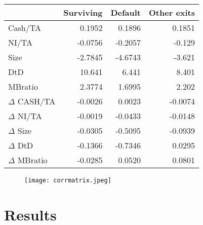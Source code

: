 \begin{table}[]
    \centering
    \begin{tabular}{lrrr}
    \hline \hline
                 & Surviving &   Default  & Other exits \\
    \hline
Cash/TA          &  0.1952 &  0.1896  &    0.1851 \\
NI/TA            & -0.0756 & -0.2057  &   -0.129 \\
Size             & -2.7845 & -4.6743  &   -3.621 \\
DtD              & 10.641 &  6.441  &    8.401 \\
MBratio          &  2.3774 &  1.6995  &    2.202 \\
$\Delta$ CASH/TA  & -0.0026 &  0.0023  &   -0.0074 \\
$\Delta$   NI/TA     & -0.0019 & -0.0433  &   -0.0148 \\
$\Delta$  Size      & -0.0305 & -0.5095  &   -0.0939 \\
$\Delta$   DtD       & -0.1366 & -0.7346  &    0.0295 \\
$\Delta$  MBratio   & -0.0285 &  0.0520  &    0.0801 \\
\hline
    \end{tabular}
    \label{tab:meanvar}
\end{table}


\begin{figure}
    \centering
    \texttt{[image: corrmatrix.jpeg]}
    \label{fig:corrmat}
\end{figure}

\section{Results}
\label{sec4}


